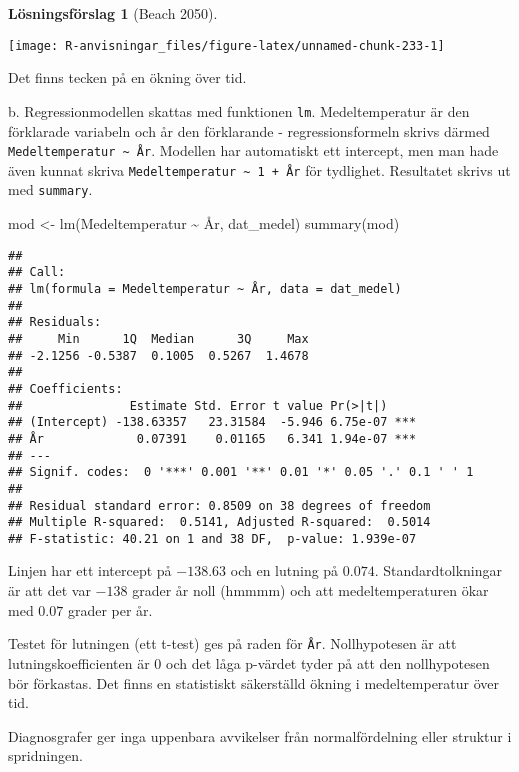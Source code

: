 \documentclass[
]{book}
\newenvironment{Shaded}{\begin{snugshade}}{\end{snugshade}}
\newcommand{\FunctionTok}[1]{\textcolor[rgb]{0.00,0.00,0.00}{#1}}
\newcommand{\NormalTok}[1]{#1}
\newcommand{\OtherTok}[1]{\textcolor[rgb]{0.56,0.35,0.01}{#1}}
\newcommand{\SpecialCharTok}[1]{\textcolor[rgb]{0.00,0.00,0.00}{#1}}
\theoremstyle{definition}
\theoremstyle{definition}
\theoremstyle{definition}
\theoremstyle{definition}
\newtheorem{hypothesis}{Lösningsförslag}[chapter]
\theoremstyle{remark}
\begin{document}
\begin{hypothesis}[Beach 2050]
\begin{center}\texttt{[image: R-anvisningar\_files/figure-latex/unnamed-chunk-233-1]} \end{center}

Det finns tecken på en ökning över tid.

b. Regressionmodellen skattas med funktionen \texttt{lm}. Medeltemperatur är den förklarade variabeln och år den förklarande - regressionsformeln skrivs därmed \texttt{Medeltemperatur\ \textasciitilde{}\ År}. Modellen har automatiskt ett intercept, men man hade även kunnat skriva \texttt{Medeltemperatur\ \textasciitilde{}\ 1\ +\ År} för tydlighet. Resultatet skrivs ut med \texttt{summary}.

\begin{Shaded}
\begin{Highlighting}[]
\NormalTok{mod }\OtherTok{\textless{}{-}} \FunctionTok{lm}\NormalTok{(Medeltemperatur }\SpecialCharTok{\textasciitilde{}}\NormalTok{ År, dat\_medel)}
\FunctionTok{summary}\NormalTok{(mod)}
\end{Highlighting}
\end{Shaded}

\begin{verbatim}
## 
## Call:
## lm(formula = Medeltemperatur ~ År, data = dat_medel)
## 
## Residuals:
##     Min      1Q  Median      3Q     Max 
## -2.1256 -0.5387  0.1005  0.5267  1.4678 
## 
## Coefficients:
##               Estimate Std. Error t value Pr(>|t|)    
## (Intercept) -138.63357   23.31584  -5.946 6.75e-07 ***
## År             0.07391    0.01165   6.341 1.94e-07 ***
## ---
## Signif. codes:  0 '***' 0.001 '**' 0.01 '*' 0.05 '.' 0.1 ' ' 1
## 
## Residual standard error: 0.8509 on 38 degrees of freedom
## Multiple R-squared:  0.5141, Adjusted R-squared:  0.5014 
## F-statistic: 40.21 on 1 and 38 DF,  p-value: 1.939e-07
\end{verbatim}

Linjen har ett intercept på \(-138.63\) och en lutning på \(0.074\). Standardtolkningar är att det var \(-138\) grader år noll (hmmmm) och att medeltemperaturen ökar med \(0.07\) grader per år.

Testet för lutningen (ett t-test) ges på raden för \texttt{År}. Nollhypotesen är att lutningskoefficienten är 0 och det låga p-värdet tyder på att den nollhypotesen bör förkastas. Det finns en statistiskt säkerställd ökning i medeltemperatur över tid.

Diagnosgrafer ger inga uppenbara avvikelser från normalfördelning eller struktur i spridningen.


\end{hypothesis}
\end{document}
